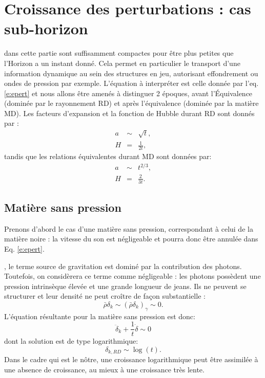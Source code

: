  \section{Croissance des perturbations : cas sub-horizon}
  dans cette partie sont suffisamment compactes pour être plus petites que l'Horizon a un instant donné. Cela permet en particulier le transport d'une information dynamique au sein des structures en jeu, autorisant effondrement ou ondes de pression par exemple. L'équation à interpréter est celle donnée par l'eq. \ref{e:epert} et nous allons être amenés à distinguer 2 époques, avant l'Équivalence (dominée par le rayonnement RD) et après l'équivalence (dominée par la matière MD). Les facteurs d'expansion et la fonction de Hubble  durant RD sont donnés par :
 \begin{eqnarray}
 a&\sim& \sqrt{t},\\
 H&=&\frac{1}{2t},
 \end{eqnarray}
 tandis que les relations équivalentes durant MD sont données par:
 \begin{eqnarray}
 a&\sim&t^{2/3},\\
 H&=&\frac{2}{3t}.
 \end{eqnarray}
 
  \subsection{Matière sans pression}
Prenons d'abord le cas d'une matière sans pression, correspondant à celui de la matière noire : la vitesse du son est négligeable et pourra donc être annulée dans Eq. \ref{e:epert}.

, le terme source de gravitation est dominé par la contribution des photons. Toutefois, on considèrera ce terme comme négligeable : les photons possèdent une pression intrinsèque élevée et une grande longueur de jeans. Ils ne peuvent se structurer et leur densité ne peut croître de façon substantielle :
\begin{equation}
\bar \rho \delta_k \sim(\bar \rho \delta_k)_\gamma \sim 0.
\end{equation}
L'équation résultante pour la matière sans pression est donc: 
\begin{equation}
\ddot \delta_k+\frac{1}{t}\dot \delta \sim 0
\end{equation}
dont la solution est de type logarithmique:
\begin{equation}
\delta_{k,RD}\sim \log(t).
\end{equation}
Dans le cadre qui est le nôtre, une croissance logarithmique peut être assimilée à une absence de croissance, au mieux à une croissance très lente.

